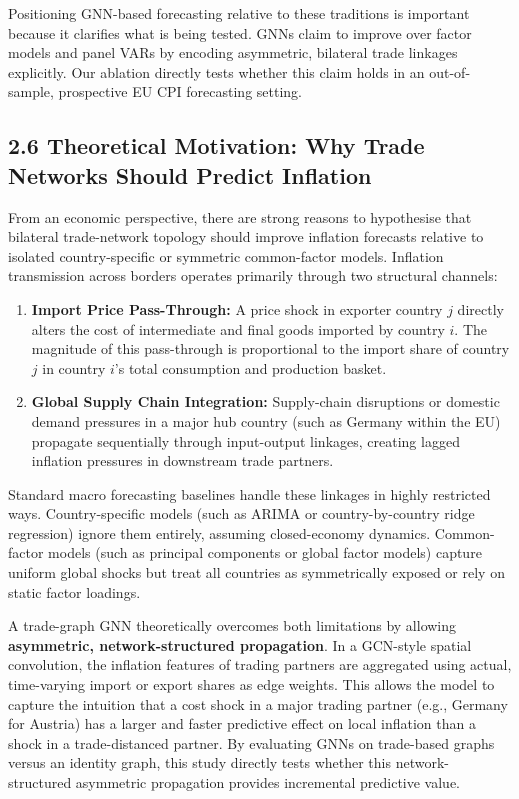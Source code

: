 \documentclass[
]{article}
\begin{document}
Positioning GNN-based forecasting relative to these traditions is important because it clarifies what is being tested. GNNs claim to improve over factor models and panel VARs by encoding asymmetric, bilateral trade linkages explicitly. Our ablation directly tests whether this claim holds in an out-of-sample, prospective EU CPI forecasting setting.

\subsection{2.6 Theoretical Motivation: Why Trade Networks Should Predict Inflation}\label{theoretical-motivation-why-trade-networks-should-predict-inflation}

From an economic perspective, there are strong reasons to hypothesise that bilateral trade-network topology should improve inflation forecasts relative to isolated country-specific or symmetric common-factor models. Inflation transmission across borders operates primarily through two structural channels:

\begin{enumerate}
\item \textbf{Import Price Pass-Through:} A price shock in exporter country $j$ directly alters the cost of intermediate and final goods imported by country $i$. The magnitude of this pass-through is proportional to the import share of country $j$ in country $i$'s total consumption and production basket.
\item \textbf{Global Supply Chain Integration:} Supply-chain disruptions or domestic demand pressures in a major hub country (such as Germany within the EU) propagate sequentially through input-output linkages, creating lagged inflation pressures in downstream trade partners.
\end{enumerate}

Standard macro forecasting baselines handle these linkages in highly restricted ways. Country-specific models (such as ARIMA or country-by-country ridge regression) ignore them entirely, assuming closed-economy dynamics. Common-factor models (such as principal components or global factor models) capture uniform global shocks but treat all countries as symmetrically exposed or rely on static factor loadings.

A trade-graph GNN theoretically overcomes both limitations by allowing \textbf{asymmetric, network-structured propagation}. In a GCN-style spatial convolution, the inflation features of trading partners are aggregated using actual, time-varying import or export shares as edge weights. This allows the model to capture the intuition that a cost shock in a major trading partner (e.g., Germany for Austria) has a larger and faster predictive effect on local inflation than a shock in a trade-distanced partner. By evaluating GNNs on trade-based graphs versus an identity graph, this study directly tests whether this network-structured asymmetric propagation provides incremental predictive value.
\end{document}
